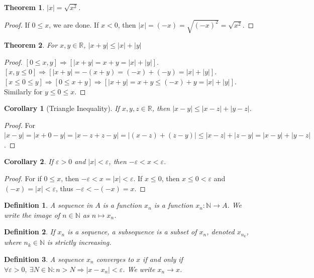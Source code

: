 \documentclass[12pt,oneside]{book}
\theoremstyle{mystyle}
\newtheorem{theorem}{Theorem}[section]
\newtheorem{definition}{Definition}[section]
\newtheorem{corollary}{Corollary}[section]
\begin{document}
\begin{theorem}
$|x| = \sqrt{x^2}$.
\end{theorem}
\begin{proof}
If $0 \leq x$, we are done. If $x<0$, then $|x| = (-x) = \sqrt{(-x)^2} = \sqrt{x^2}$.
\end{proof}

\begin{theorem}
For $x,y \in \mathbb{R}$, $|x+y|\leq |x|+|y|$
\end{theorem}
\begin{proof}
$[0\leq x,y]\Rightarrow [|x+y| = x+y = |x|+|y|]$. $[x,y\leq 0]\Rightarrow [|x+y| = -(x+y) = (-x)+(-y)=|x|+|y|]$. $[x\leq 0 \leq y]\Rightarrow [0\leq x+y]\Rightarrow [|x+y| = x+y \leq (-x)+y=|x|+|y|]$. Similarly for $y\leq 0 \leq x$.
\end{proof}

\begin{corollary}[Triangle Inequality]
If $x,y,z\in \mathbb{R}$, then $|x-y| \leq |x-z|+|y-z|$.
\end{corollary}
\begin{proof}
For $|x-y| = |x+ 0 - y| = |x-z+z-y| = |(x-z)+(z-y)| \leq |x-z|+|z-y| = |x-y|+|y-z|$.
\end{proof}

\begin{corollary}
If $\varepsilon >0$ and $|x|<\varepsilon$, then $-\varepsilon < x < \varepsilon$.
\end{corollary}
\begin{proof}
For if $0\leq x$, then $-\varepsilon< x=|x|< \varepsilon$. If $x\leq 0$, then $x\leq 0<\varepsilon$ and $(-x)=|x|<\varepsilon$, thus $-\varepsilon < -(-x) = x$.
\end{proof}

\begin{definition}
A sequence in $A$ is a function $x_n$ is a function $x_n:\mathbb{N}\rightarrow A$. We write the image of $n\in \mathbb{N}$ as $n\mapsto x_n$.
\end{definition}

\begin{definition}
If $x_n$ is a sequence, a subsequence is a subset of $x_n$, denoted $x_{n_k}$, where $n_k\in \mathbb{N}$ is strictly increasing.
\end{definition}

\begin{definition}
A sequence $x_n$ converges to $x$ if and only if $\forall \varepsilon>0,\ \exists N\in \mathbb{N}: n>N\Rightarrow |x-x_n|<\varepsilon$. We write $x_n \rightarrow x$.
\end{definition}
\end{document}
